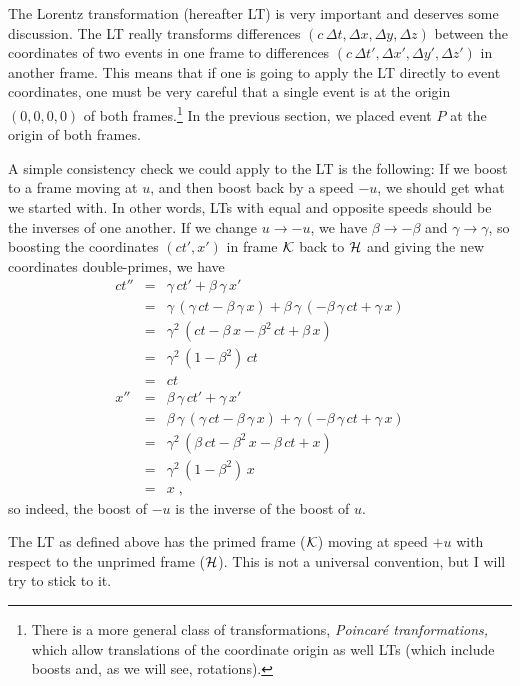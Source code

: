 The Lorentz transformation (hereafter LT) is very important and
deserves some discussion.  The LT really transforms differences
$(c\,\Delta t,\Delta x,\Delta y,\Delta z)$ between the coordinates of
two events in one frame to differences $(c\,\Delta t',\Delta x',\Delta
y',\Delta z')$ in another frame.  This means that if one is going to
apply the LT directly to event coordinates, one must be very careful
that a single event is at the origin $(0,0,0,0)$ of both
frames.\footnote{There is a more general class of transformations,
{\em Poincar\'e tranformations,\/} which allow translations of the
coordinate origin as well LTs (which include boosts and, as we will
see, rotations).}  In the previous section, we placed event $P$ at the
origin of both frames.

A simple consistency check we could apply to the LT is the following:
If we boost to a frame moving at $u$, and then boost back by a speed
$-u$, we should get what we started with.  In other words, LTs with
equal and opposite speeds should be the inverses of one another.  If
we change $u\rightarrow -u$, we have $\beta\rightarrow -\beta$ and
$\gamma\rightarrow\gamma$, so boosting the coordinates $(ct',x')$ in
frame $\cal K$ back to $\cal H$ and giving the new coordinates
double-primes, we have
\begin{eqnarray}
ct'' & = & \gamma\, ct' + \beta\,\gamma\, x' \nonumber \\
     & = & \gamma\, (\gamma\, ct - \beta\,\gamma\, x) 
           + \beta\,\gamma\, (- \beta\,\gamma\, ct + \gamma\, x) \nonumber \\
     & = & \gamma^2\, (ct - \beta\, x - \beta^2\, ct + \beta\, x) \nonumber \\
     & = & \gamma^2\, (1 - \beta^2)\, ct \nonumber \\
     & = & ct \\
 x'' & = & \beta\,\gamma\, ct' + \gamma\, x' \nonumber \\
     & = & \beta\,\gamma\, (\gamma\, ct - \beta\,\gamma\, x)
           + \gamma\, (- \beta\,\gamma\, ct + \gamma\, x) \nonumber \\
     & = & \gamma^2\, (\beta\, ct - \beta^2\, x - \beta\, ct + x) \nonumber \\
     & = & \gamma^2\, (1 - \beta^2)\, x \nonumber \\
     & = & x \; ,
\end{eqnarray}
so indeed, the boost of $-u$ is the inverse of the boost of $u$.

The LT as defined above has the primed frame ($\cal K$) moving at
speed $+u$ with respect to the unprimed frame ($\cal H$).  This is
not a universal convention, but I will try to stick to it.

